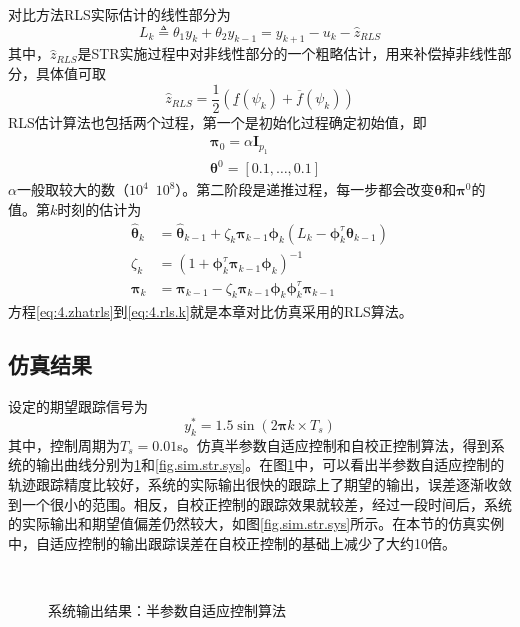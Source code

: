 对比方法RLS实际估计的线性部分为
\begin{equation}\label{eq:4.zrls}
L_{k}\triangleq\theta_{1}y_{k} + \theta_{2} y_{k-1}=y_{k+1}-u_{k}-\hat{z}_{RLS}
\end{equation}
其中，$\hat{z}_{RLS}$是STR实施过程中对非线性部分的一个粗略估计，用来补偿掉非线性部分，具体值可取
\begin{equation}\label{eq:4.zhatrls}
\hat{z}_{RLS}=\frac12 (\underline{f}(\psi_{k})+\overline{f}(\psi_{k})) 
\end{equation}
RLS估计算法也包括两个过程，第一个是初始化过程确定初始值，即
\begin{equation}\label{eq:4.rls.0}
\begin{split}
&\bm{\pi}_{0}=\alpha \bm{I}_{p_{1}}\\
&\bm{\theta}^{0}=[0.1,\dots,0.1]
\end{split}
\end{equation}
$\alpha$一般取较大的数（$10^{4}$~$10^{8}$）。第二阶段是递推过程，每一步都会改变$\bm{\theta}$和$\bm{\pi}^{0}$的值。第$k$时刻的估计为
\begin{equation}\label{eq:4.rls.k}
\begin{split}
\hat{\bm{\theta}}_{k}&=\hat{\bm{\theta}}_{k-1}+ \zeta_{k} \bm{\pi}_{k-1} \bm{\phi}_{k} (L_{k}-\bm{\phi}_k^\tau \bm{\theta}_{k-1})\\
\zeta_k&=(1+\bm{\phi}_{k}^{\tau} \bm{\pi}_{k-1} \bm{\phi}_{k})^{-1}\\
\bm{\pi}_{k}&=\bm{\pi}_{k-1}-\zeta_k \bm{\pi}_{k-1} \bm{\phi}_{k} \bm{\phi}_{k}^{\tau} \bm{\pi}_{k-1}
\end{split}
\end{equation}
方程\eqref{eq:4.zhatrls}到\eqref{eq:4.rls.k}就是本章对比仿真采用的RLS算法。

\subsection{仿真结果}\label{sect:4.4.2}
设定的期望跟踪信号为
\begin{equation}\label{eq:4.sim.yd}
y_{k}^{*} = 1.5\sin(2\bm{\pi} k\times T_{s})
\end{equation}
其中，控制周期为$T_{s}=0.01$s。仿真半参数自适应控制和自校正控制算法，得到系统的输出曲线分别为\ref{fig.sim.elm.sys}和\ref{fig.sim.str.sys}。在图\ref{fig.sim.elm.sys}中，可以看出半参数自适应控制的轨迹跟踪精度比较好，系统的实际输出很快的跟踪上了期望的输出，误差逐渐收敛到一个很小的范围。相反，自校正控制的跟踪效果就较差，经过一段时间后，系统的实际输出和期望值偏差仍然较大，如图\ref{fig.sim.str.sys}所示。在本节的仿真实例中，自适应控制的输出跟踪误差在自校正控制的基础上减少了大约10倍。
\begin{figure}[!htb]
	\centering
	\\
	\caption{系统输出结果：半参数自适应控制算法}
	\label{fig.sim.elm.sys}
\end{figure}

